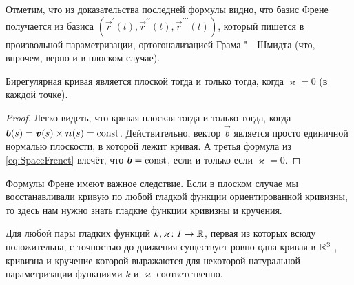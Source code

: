 Отметим, что из доказательства последней формулы видно, что базис Френе получается из базиса $(\vec{r}^\prime(t), \vec{r}^{\prime\prime}(t), \vec{r}^{\prime\prime\prime}(t))$, который пишется в произвольной параметризации, ортогонализацией Грама "---Шмидта (что, впрочем, верно и в плоском случае).

\begin{proposition}
	Бирегулярная кривая является плоской тогда и только тогда, когда $\varkappa = 0$ (в каждой точке).
\end{proposition}

\begin{proof}
	Легко видеть, что кривая плоская тогда и только тогда, когда $\vec{b}(s) \hm= \vec{v}(s) \times \vec{n}(s) = \const$. Действительно, вектор $\vec{b}$ является просто единичной нормалью плоскости, в которой лежит кривая. А третья формула из \eqref{eq:SpaceFrenet} влечёт, что $\boldsymbol{b} = \mathrm{const}$, если и только если $\varkappa = 0$.
\end{proof}

Формулы Френе имеют важное следствие. Если в плоском случае мы восстанавливали кривую по любой гладкой функции ориентированной кривизны, то здесь нам нужно знать гладкие функции кривизны и кручения.

\begin{theorem} \label{theorem:FundamentalSpaceCurves}
	Для любой пары гладких функций $k, \varkappa\colon I \to \mathbb{R}$, первая из которых всюду положительна, с точностью до движения существует ровно одна кривая в $\mathbb{R}^3$ , кривизна и кручение которой выражаются для некоторой натуральной параметризации функциями $k$ и $\varkappa$ соответственно.
\end{theorem}

